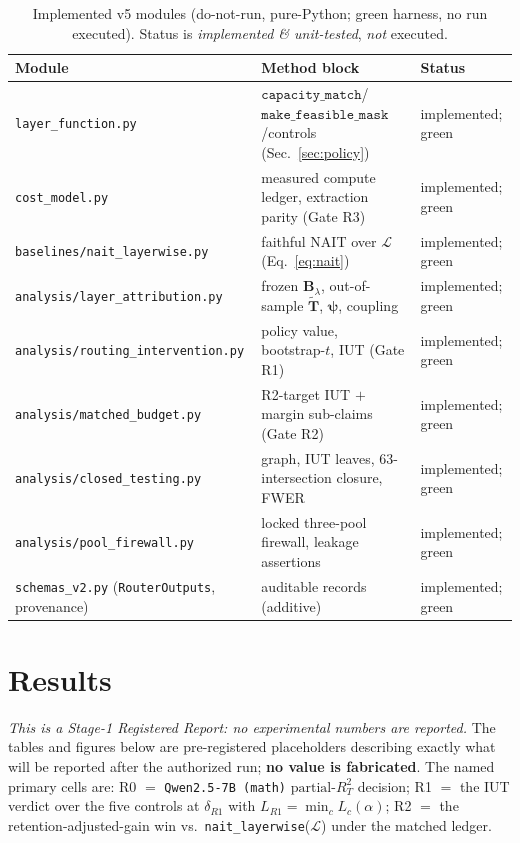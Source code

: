 \documentclass[11pt]{article}
\theoremstyle{definition}
\newcommand{\Ttil}{\widetilde{\mathbf{T}}}
\newcommand{\Blam}{\mathbf{B}_{\lambda}}
\newcommand{\Lset}{\mathcal{L}}
\newcommand{\psivec}{\bm{\psi}}
\begin{document}
\begin{table}[t]
\centering
\caption{Implemented v5 modules (do-not-run, pure-Python; green harness, no run executed).
Status is \emph{implemented \& unit-tested}, \emph{not} executed.}
\label{tab:modules}
\small
\begin{tabular}{lll}
\toprule
Module & Method block & Status \\
\midrule
\texttt{layer\_function.py} & $\texttt{capacity\_match}$/$\texttt{make\_feasible\_mask}$/controls (Sec.~\ref{sec:policy}) & implemented; green \\
\texttt{cost\_model.py} & measured compute ledger, extraction parity (Gate R3) & implemented; green \\
\texttt{baselines/nait\_layerwise.py} & faithful NAIT over $\Lset$ (Eq.~\eqref{eq:nait}) & implemented; green \\
\texttt{analysis/layer\_attribution.py} & frozen $\Blam$, out-of-sample $\Ttil$, $\psivec$, coupling & implemented; green \\
\texttt{analysis/routing\_intervention.py} & policy value, bootstrap-$t$, IUT (Gate R1) & implemented; green \\
\texttt{analysis/matched\_budget.py} & R2-target IUT $+$ margin sub-claims (Gate R2) & implemented; green \\
\texttt{analysis/closed\_testing.py} & graph, IUT leaves, 63-intersection closure, FWER & implemented; green \\
\texttt{analysis/pool\_firewall.py} & locked three-pool firewall, leakage assertions & implemented; green \\
\texttt{schemas\_v2.py} (\texttt{RouterOutputs}, provenance) & auditable records (additive) & implemented; green \\
\bottomrule
\end{tabular}
\end{table}

\section{Results}
\label{sec:results}
\emph{This is a Stage-1 Registered Report: no experimental numbers are reported.} The
tables and figures below are pre-registered placeholders describing exactly what will be
reported after the authorized run; \textbf{no value is fabricated}. The named primary cells
are: R0 $=$ \texttt{Qwen2.5-7B (math)} $\mathrm{partial\text{-}}R^2_T$ decision; R1 $=$ the
IUT verdict over the five controls at $\delta_{R1}$ with $L_{R1}=\min_c L_c(\alpha)$; R2 $=$
the retention-adjusted-gain win vs.\ \texttt{nait\_layerwise}($\Lset$) under the matched
ledger.
\end{document}
